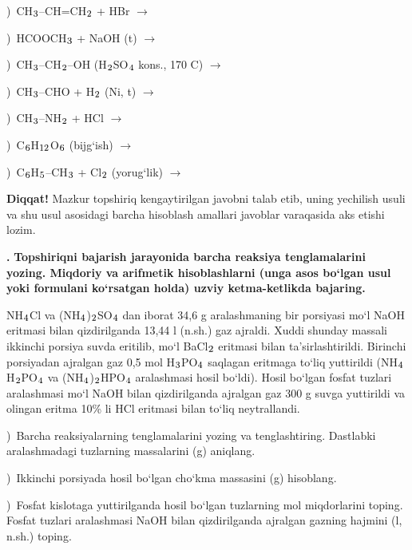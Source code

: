 \documentclass[11pt,a4paper]{article}
\renewcommand{\textsubscript}[1]{\ensuremath{_{\text{\fontsize{8}{8}\selectfont #1}}}}
\newcommand{\qn}[1]{\textbf{\fontsize{11.5}{13}\selectfont #1}}
\newcommand{\qsep}{\par\vspace{13pt}}
\newcommand{\diqqat}[1]{\par\smallskip\noindent\textbf{Diqqat!} #1\par\medskip}
\begin{document}
)\ CH\textsubscript{3}--CH=CH\textsubscript{2} + HBr $\to$\par
{})\ HCOOCH\textsubscript{3} + NaOH (t) $\to$\par
{})\ CH\textsubscript{3}--CH\textsubscript{2}--OH (H\textsubscript{2}SO\textsubscript{4} kons., 170 \textdegree{}C) $\to$\par
{})\ CH\textsubscript{3}--CHO + H\textsubscript{2} (Ni, t) $\to$\par
{})\ CH\textsubscript{3}--NH\textsubscript{2} + HCl $\to$\par
{})\ C\textsubscript{6}H\textsubscript{12}O\textsubscript{6} (bijg`ish) $\to$\par
{})\ C\textsubscript{6}H\textsubscript{5}--CH\textsubscript{3} + Cl\textsubscript{2} (yorug`lik) $\to$\par
\diqqat{Mazkur topshiriq kengaytirilgan javobni talab etib, uning yechilish usuli va shu usul asosidagi barcha hisoblash amallari javoblar varaqasida aks etishi lozim.}\qsep
\noindent\qn{43.} \textbf{Topshiriqni bajarish jarayonida barcha reaksiya tenglamalarini yozing. Miqdoriy va arifmetik hisoblashlarni (unga asos bo`lgan usul yoki formulani ko`rsatgan holda) uzviy ketma-ketlikda bajaring.}\par\smallskip
NH\textsubscript{4}Cl va (NH\textsubscript{4})\textsubscript{2}SO\textsubscript{4} dan iborat 34,6 g aralashmaning bir porsiyasi mo`l NaOH eritmasi bilan qizdirilganda 13,44 l (n.sh.) gaz ajraldi. Xuddi shunday massali ikkinchi porsiya suvda eritilib, mo`l BaCl\textsubscript{2} eritmasi bilan ta'sirlashtirildi. Birinchi porsiyadan ajralgan gaz 0,5 mol H\textsubscript{3}PO\textsubscript{4} saqlagan eritmaga to`liq yuttirildi (NH\textsubscript{4}H\textsubscript{2}PO\textsubscript{4} va (NH\textsubscript{4})\textsubscript{2}HPO\textsubscript{4} aralashmasi hosil bo`ldi). Hosil bo`lgan fosfat tuzlari aralashmasi mo`l NaOH bilan qizdirilganda ajralgan gaz 300 g suvga yuttirildi va olingan eritma 10\% li HCl eritmasi bilan to`liq neytrallandi.\par
{})\ Barcha reaksiyalarning tenglamalarini yozing va tenglashtiring. Dastlabki aralashmadagi tuzlarning massalarini (g) aniqlang.\par
{})\ Ikkinchi porsiyada hosil bo`lgan cho`kma massasini (g) hisoblang.\par
{})\ Fosfat kislotaga yuttirilganda hosil bo`lgan tuzlarning mol miqdorlarini toping. Fosfat tuzlari aralashmasi NaOH bilan qizdirilganda ajralgan gazning hajmini (l, n.sh.) toping.\par
\end{document}
